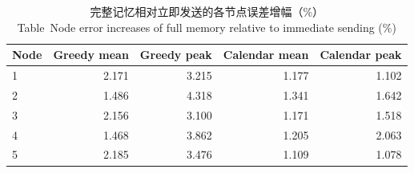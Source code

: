 \begin{table}[htbp]
\centering\small
\caption{完整记忆相对立即发送的各节点误差增幅（\%）\\ Table~\thetable\quad Node error increases of full memory relative to immediate sending (\%)}\label{tab:node}
\begin{tabular}{lrrrr}
\toprule
Node & Greedy mean & Greedy peak & Calendar mean & Calendar peak\\
\midrule
1 & 2.171 & 3.215 & 1.177 & 1.102\\
2 & 1.486 & 4.318 & 1.341 & 1.642\\
3 & 2.156 & 3.100 & 1.171 & 1.518\\
4 & 1.468 & 3.862 & 1.205 & 2.063\\
5 & 2.185 & 3.476 & 1.109 & 1.078\\
\bottomrule
\end{tabular}
\end{table}
